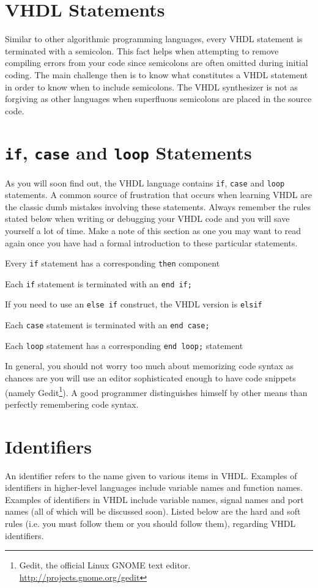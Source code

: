 \section{VHDL Statements}
Similar to other algorithmic programming languages, every VHDL statement is terminated with a semicolon. This fact helps when attempting to remove compiling errors from your code since semicolons are often omitted during initial coding. The main challenge then is to know what constitutes a VHDL statement in order to know when to include semicolons. The VHDL synthesizer is not as forgiving as other languages when superfluous semicolons are placed in the source code.

\section{\texttt{if}, \texttt{case} and \texttt{loop} Statements}
As you will soon find out, the VHDL language contains \texttt{if}, \texttt{case} and \texttt{loop} statements. A common source of frustration that occurs when learning VHDL are the classic dumb mistakes involving these statements. Always remember the rules stated below when writing or debugging your VHDL code and you will save yourself a lot of time. Make a note of this section as one you may want to read again once you have had a formal introduction to these particular statements.
\begin{my_list}
\item Every \texttt{if} statement has a corresponding \texttt{then} component
\item Each \texttt{if} statement is terminated with an \texttt{end if;}
\item If you need to use an \texttt{else if} construct, the VHDL version is \texttt{elsif}
\item Each \texttt{case} statement is terminated with an \texttt{end case;}
\item Each \texttt{loop} statement has a corresponding \texttt{end loop;} statement
\end{my_list}
In general, you should not worry too much about memorizing code syntax as chances are you will use an editor sophisticated enough to have code snippets (namely Gedit\footnote{Gedit, the official Linux GNOME text editor. \url{http://projects.gnome.org/gedit}}). A good programmer distinguishes himself by other means than perfectly remembering code syntax.

\section{Identifiers}
An identifier refers to the name given to various items in VHDL. Examples of identifiers in higher-level languages include variable names and function names. Examples of identifiers in VHDL include variable names, signal names and port names (all of which will be discussed soon). Listed below are the hard and soft rules (i.e. you must follow them or you should follow them), regarding VHDL identifiers.

